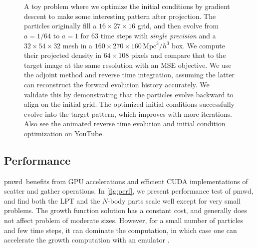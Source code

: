 \documentclass[modern, dvipsnames]{aastex631}
\newcommand{\pmwd}{{\usefont{T1}{nova}{m}{sl}pmwd}}
\newcommand{\Mpc}{\mathrm{Mpc}}
\begin{document}
\begin{figure}[t]
{}
\\
\hfill
{}
\\
\caption{A toy problem where we optimize the initial conditions by
gradient descent to make some interesting pattern after projection.
The particles originally fill a $16\times27\times16$ grid, and then
evolve from $a=1/64$ to $a=1$ for 63 time steps with \emph{single
precision} and a $32\times54\times32$ mesh in a $160\times270\times160
\, \Mpc^3/h^3$ box.
We compute their projected density in $64\times108$ pixels and compare
that to the target image at the same resolution with an MSE objective.
We use the adjoint method and reverse time integration, assuming the
latter can reconstruct the forward evolution history accurately.
We validate this by demonstrating that the particles evolve backward to
align on the initial grid.
The optimized initial conditions successfully evolve into the target
pattern, which improves with more iterations.
Also see the animated reverse time evolution
\href{https://youtu.be/Epsgh6vr0qs}{\faYoutubePlay} and initial
condition optimization
\href{https://youtu.be/vD6lbjHP3SY}{\faYoutubePlay} on YouTube.
}
\label{fig:optim}
\end{figure}


\vspace{1em}
\subsection{Performance}

\pmwd\ benefits from GPU accelerations and efficient CUDA
implementations of scatter and gather operations.
In \autoref{fig:perf}, we present performance test of \pmwd, and find
both the LPT and the $N$-body parts scale well except for very small
problems.
The growth function solution has a constant cost, and generally does not
affect problem of moderate sizes.
However, for a small number of particles and few time steps, it can
dominate the computation, in which case one can accelerate the growth
computation with an emulator \citep{KwanModiEtAl2022}.
\end{document}
